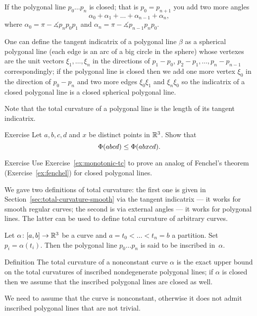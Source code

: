 If the polygonal line $p_0\dots p_n$ is closed; that is $p_0=p_{n+1}$ you add two more angles 
\[\alpha_0+\alpha_1+\dots+\alpha_{n-1} + \alpha_n ,\]
where $\alpha_0=\pi-\measuredangle p_{n}p_0p_{1}$ and $\alpha _n = \pi - \measuredangle p_{n-1} p_n p_0$.

One can define the tangent indicatrix of a polygonal line $\beta$ as a spherical polygonal line (each edge is an arc of a big circle in the sphere) whose vertexes are the unit vectors $\xi_1,\dots,\xi_n$ in the directions of $p_1-p_0$, $p_2-p_1,\dots, p_n-p_{n-1}$ correspondingly;
if the  polygonal line is closed then we add one more vertex $\xi_0$ in the direction of $p_0-p_{n}$ and two more edges $\xi_0\xi_1$ and $\xi_n\xi_0$ so the indicatrix of a closed polygonal line is a closed spherical polygonal line.

Note that the total curvature of a polygonal line is the length of its tangent indicatrix.

\begin{thm}{Exercise}\label{ex:monotonic-tc}
Let $a,b,c,d$ and $x$ be distinct points in $\mathbb{R}^3$.
Show that 
\[\Phi({abcd}) \leq \Phi({abxcd}).\]
\end{thm}

\begin{thm}{Exercise}\label{ex:poly-fenchel}
Use Exercise~\ref{ex:monotonic-tc} to prove an analog of Fenchel's theorem (Exercise~\ref{ex:fenchel}) for closed polygonal lines.
\end{thm}


We gave two definitions of total curvature:
the first one is given in Section~\ref{sec:total-curvature-smooth} via the tangent indicatrix --- it works for smooth regular curves;
the second is via external angles --- it works for polygonal lines.
The latter can be used to define total curvature of arbitrary curves.


Let  $\alpha\colon[a,b]\to \mathbb{R}^3$ be a curve and  $a=t_0<\dots<t_n=b$ a partition.
Set $p_i=\alpha(t_i)$.
Then the polygonal line $p_0\dots p_n$ is said to be inscribed in~$\alpha$. 

\begin{thm}{Definition}\label{def:total-curv-poly}
The total curvature of a nonconstant curve $\alpha$ is the exact upper bound on the total curvatures of inscribed nondegenerate polygonal lines;
if $\alpha$ is closed then we assume that the inscribed polygonal lines are closed as well.
\end{thm}

We need to assume that the curve is nonconstant, otherwise it does not admit inscribed polygonal lines that are not trivial.

